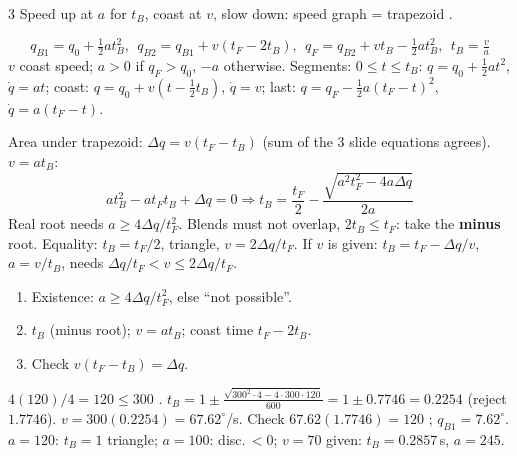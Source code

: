 \begin{multicols}{3}
Speed up at $a$ for $t_B$, coast at $v$, slow down: speed graph = trapezoid .
\begin{fbx}[Slide equations \pg{33--34}, $t_0=0$]
\[q_{B1}=q_0+\tfrac12at_B^2,\ \ q_{B2}=q_{B1}+v(t_F-2t_B),\ \ q_F=q_{B2}+vt_B-\tfrac12at_B^2,\ \ t_B=\tfrac va\]
$v$ coast speed; $a>0$ if $q_F>q_0$, $-a$ otherwise. Segments: $0\le t\le t_B$: $q=q_0+\frac12at^2$, $\dot q=at$; coast: $q=q_0+v(t-\frac12t_B)$, $\dot q=v$; last: $q=q_F-\frac12a(t_F-t)^2$, $\dot q=a(t_F-t)$.
\end{fbx}
\begin{deriv}
Area under trapezoid: $\Delta q=v(t_F-t_B)$ (sum of the 3 slide equations agrees). $v=at_B$:
\[\boxed{at_B^2-at_Ft_B+\Delta q=0}\Rightarrow t_B=\frac{t_F}2-\frac{\sqrt{a^2t_F^2-4a\Delta q}}{2a}\]
Real root needs $\boxed{a\ge4\Delta q/t_F^2}$. Blends must not overlap, $2t_B\le t_F$: take the \textbf{minus} root. Equality: $t_B=t_F/2$, triangle, $v=2\Delta q/t_F$. If $v$ is given: $t_B=t_F-\Delta q/v$, $a=v/t_B$, needs $\Delta q/t_F<v\le2\Delta q/t_F$. \chk
\end{deriv}
\begin{recipe}
\begin{enumerate}
\item Existence: $a\ge4\Delta q/t_F^2$, else ``not possible''.
\item $t_B$ (minus root); $v=at_B$; coast time $t_F-2t_B$.
\item Check $v(t_F-t_B)=\Delta q$.
\end{enumerate}
\end{recipe}
\begin{worked}[slide p.\,37: $120^\circ$ in 2\,s, $a=300^\circ$/s$^2$]
$4(120)/4=120\le300$ \checkmark. $t_B=1\pm\frac{\sqrt{300^2\cdot4-4\cdot300\cdot120}}{600}=1\pm0.7746=0.2254$ (reject $1.7746$). $v=300(0.2254)=67.62^\circ$/s. Check $67.62(1.7746)=120$ \checkmark; $q_{B1}=7.62^\circ$. $a=120$: $t_B=1$ triangle; $a=100$: disc.\,$<0$; $v=70$ given: $t_B=0.2857$\,s, $a=245$. \chk
\end{worked}

\end{multicols}
